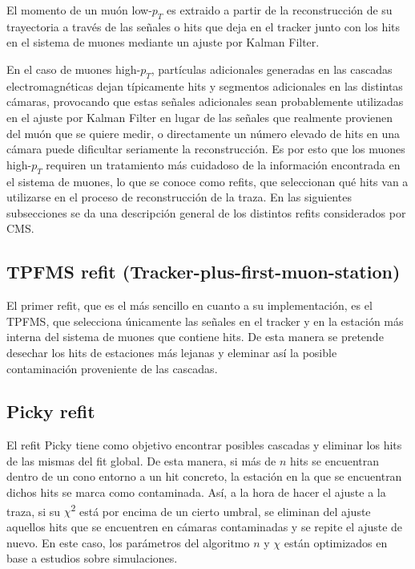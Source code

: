 
El momento de un mu\'on low-$p_{T}$ es extraido a partir de la reconstrucci\'on de su trayectoria a trav\'es de las señales o hits que deja en el tracker junto con los hits en el sistema de muones mediante un ajuste por Kalman Filter. 

En el caso de muones high-$p_{T}$, part\'iculas adicionales generadas en las cascadas electromagn\'eticas dejan t\'ipicamente hits y segmentos adicionales en las distintas c\'amaras, provocando que estas señales adicionales sean probablemente utilizadas en el ajuste por Kalman Filter en lugar de las señales que realmente provienen del mu\'on que se quiere medir, o directamente un n\'umero elevado de hits en una c\'amara puede dificultar seriamente la reconstrucci\'on. Es por esto que los muones high-$p_{T}$ requiren un tratamiento m\'as cuidadoso de la informaci\'on encontrada en el sistema de muones, lo que se conoce como refits, que seleccionan qu\'e hits van a utilizarse en el proceso de reconstrucci\'on de la traza. En las siguientes subsecciones se da una descripci\'on general de los distintos refits considerados por CMS.

\subsection{TPFMS refit (Tracker-plus-first-muon-station)}\label{sec:TPFMS}

El primer refit, que es el m\'as sencillo en cuanto a su implementaci\'on, es el TPFMS, que selecciona \'unicamente las señales en el tracker y en la estaci\'on m\'as interna del sistema de muones que contiene hits. De esta manera se pretende desechar los hits de estaciones m\'as lejanas y eleminar as\'i la posible contaminaci\'on proveniente de las cascadas.

\subsection{Picky refit}\label{sec:Picky}

El refit Picky tiene como objetivo encontrar posibles cascadas y eliminar los hits de las mismas del fit global. De esta manera, si m\'as de $n$ hits se encuentran dentro de un cono entorno a un hit concreto, la estaci\'on en la que se encuentran dichos hits se marca como contaminada. As\'i, a la hora de hacer el ajuste a la traza, si su $\chi$\textsuperscript{2} est\'a por encima de un cierto umbral, se eliminan del ajuste aquellos hits que se encuentren en c\'amaras contaminadas y se repite el ajuste de nuevo. En este caso, los par\'ametros del algoritmo $n$ y $\chi$ est\'an optimizados en base a estudios sobre simulaciones.

